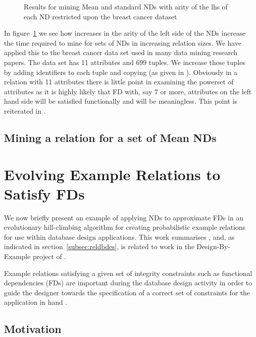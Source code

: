 \begin{figure}
\centerline{}
\caption{\label{graph:nd_mine1}\scriptsize{Results for mining Mean and
standard NDs with arity of the lhs of each ND restricted upon the
breast cancer dataset}}
\end{figure}

In figure~\ref{graph:nd_mine1} we see how increases in the arity of
the left side of the NDs increase the time required to mine for sets
of NDs in increasing relation sizes. We have applied this to the
breast cancer data set \cite{bkm98} used in many data mining research
papers. The data set has 11 attributes and 699 tuples. We increase
these tuples by adding identifiers to each tuple and copying (as
given in \cite{hkp98}). Obviously in a relation with 11 attributes
there is little point in examining the powerset of attributes as it is
highly likely that FD with, say 7 or more, attributes on the left hand
side will be satisfied functionally and will be meaningless. This
point is reiterated in \cite{sf93}.

\subsection{Mining a relation for a set of Mean NDs}
 

\section{Evolving Example Relations to Satisfy FDs}\label{sec:nd_evolve}

We now briefly present an example of applying NDs to approximate FDs
in an evolutionary hill-climbing algorithm for creating probabilistic
example relations for use within database design applications. This
work summarises \cite{cl98}, and, as indicated in
section~\ref{subsec:reldbdes}, is related to work in the
Design-By-Example project of \cite{mr86}.

\smallskip

Example relations satisfying a given set of integrity constraints such as 
functional dependencies (FDs) are important during the database design 
activity in order to guide the designer towards the specification of a correct 
set of constraints for the application in hand \cite{sm81}. 



\subsection{Motivation}

